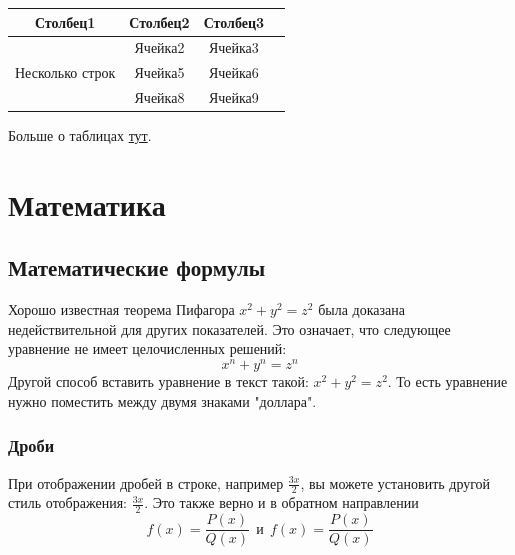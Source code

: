 \begin{center} %
\begin{tabular}{ |c|c|c|c| } %
\hline
Столбец1 & Столбец2 & Столбец3 \\ %
\hline
\multirow{3}{5em}{Несколько строк} & Ячейка2 & Ячейка3 \\ 
& Ячейка5 & Ячейка6 \\ %
& Ячейка8 & Ячейка9 \\ 
\hline %
\end{tabular}
\end{center}

Больше о таблицах \href{https://www.overleaf.com/learn/latex/Tables}{тут}.

\section{Математика}

    \subsection{Математические формулы}
    Хорошо известная теорема Пифагора \(x^2 + y^2 = z^2\) была
    доказана недействительной для других показателей.
    Это означает, что следующее уравнение не имеет целочисленных решений:
    \[ x^n + y^n = z^n \]
    Другой способ вставить уравнение в текст такой: $x^2 + y^2 = z^2$. То есть уравнение нужно поместить между двумя знаками "доллара".

    \subsubsection{Дроби}
    При отображении дробей в строке, например \(\frac{3x}{2}\),
    вы можете установить другой стиль отображения:
    \( \displaystyle \frac{3x}{2} \).
    Это также верно и в обратном направлении
    \[ f(x)=\frac{P(x)}{Q(x)} \ \ \textrm{и}
    \ \ f(x)=\textstyle\frac{P(x)}{Q(x)} \]

